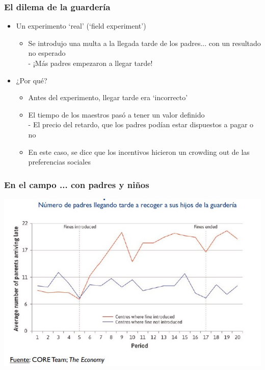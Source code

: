 \documentclass{beamer}
\begin{document}
\begin{frame}
\frametitle{ El dilema de la guardería}
\begin{itemize}
    \item Un experimento `real' (`field experiment')
       \begin{itemize}
       \item Se introdujo una multa a la llegada tarde de los padres... con un resultado no esperado \\
        - ¡Más padres empezaron a llegar tarde!
        \end{itemize}
    \item ¿Por qué?
        \begin{itemize}
        \item Antes del experimento, llegar tarde era `incorrecto' 
        \item El tiempo de los maestros pasó a tener un valor definido \\
        - El precio del retardo, que los padres podían estar dispuestos a pagar o no \\ 
        \item En este caso, se dice que los incentivos hicieron un crowding out de las preferencias sociales
    \end{itemize}
\end{itemize}
\end{frame}

\begin{frame}
\frametitle{ En el campo ... con padres y niños}
\centering
\includegraphics[scale=0.6]{Figures/Tema_03_28_guarderia.jpg}
\end{frame}
\end{document}
